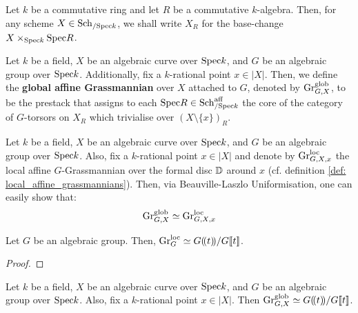                     \begin{convention}
                        Let $k$ be a commutative ring and let $R$ be a commutative $k$-algebra. Then, for any scheme $X \in \mathrm{Sch}_{/\mathrm{Spec} k}$, we shall write $X_R$ for the base-change $X \x_{\Spec k} \Spec R$.
                    \end{convention}
                    \begin{definition} \label{def: global_affine_grassmannians}
                        Let $k$ be a field, $X$ be an algebraic curve over $\mathrm{Spec} k$, and $G$ be an algebraic group over $\mathrm{Spec} k$. Additionally, fix a $k$-rational point $x \in |X|$. Then, we define the \textbf{global affine Grassmannian} over $X$ attached to $G$, denoted by $\mathrm{Gr}_{G, X}^{\mathrm{glob}}$, to be the prestack that assigns to each $\mathrm{Spec} R \in \mathrm{Sch}_{/\mathrm{Spec} k}^{\mathrm{aff}}$ the core of the category of $G$-torsors on $X_R$ which trivialise over $(X \setminus \{x\})_R$.
                    \end{definition}
                    \begin{remark} \label{remark: local_to_global_for_affine_grassmannians}
                        Let $k$ be a field, $X$ be an algebraic curve over $\mathrm{Spec} k$, and $G$ be an algebraic group over $\mathrm{Spec} k$. Also, fix a $k$-rational point $x \in |X|$ and denote by $\mathrm{Gr}_{G, X, x}^{\mathrm{loc}}$ the local affine $G$-Grassmannian over the formal disc $\mathbb{D}$ around $x$ (cf. definition \ref{def: local_affine_grassmannians}). Then, via Beauville-Laszlo Uniformisation, one can easily show that:
                            $$\mathrm{Gr}_{G, X}^{\mathrm{glob}} \simeq \mathrm{Gr}_{G, X, x}^{\mathrm{loc}}$$
                    \end{remark}
                    
                    \begin{lemma} \label{lemma: affine_grassmannians_as_coset_spaces}
                        Let $G$ be an algebraic group. Then, $\mathrm{Gr}_G^{\mathrm{loc}} \simeq G(\!(t)\!)/G[\![t]\!]$.
                    \end{lemma}
                        \begin{proof}
                            
                        \end{proof}
                    \begin{corollary}
                        Let $k$ be a field, $X$ be an algebraic curve over $\mathrm{Spec} k$, and $G$ be an algebraic group over $\mathrm{Spec} k$. Also, fix a $k$-rational point $x \in |X|$. Then $\mathrm{Gr}_{G, X}^{\mathrm{glob}} \simeq G(\!(t)\!)/G[\![t]\!]$.
                    \end{corollary}
                    
